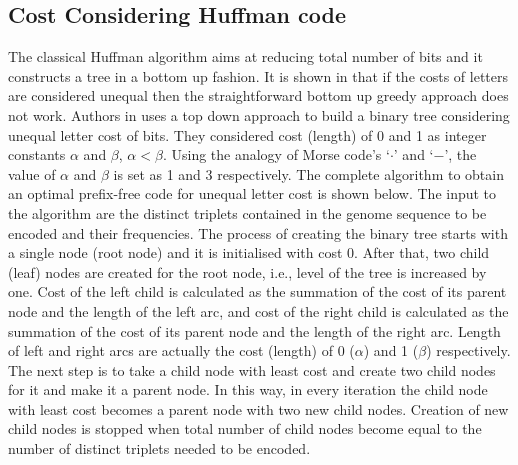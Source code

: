 \documentclass[preprint,12pt]{elsarticle}
\begin{document}
\subsection{Cost Considering Huffman code}
The classical Huffman algorithm aims at reducing total number of bits and it constructs a tree in a bottom up fashion. It is shown in \cite{golin98} that if the costs of letters are considered unequal then the straightforward bottom up greedy approach does not work. Authors in \cite{Kab14} uses a top down approach to build a binary tree considering unequal letter cost of bits. They considered cost (length) of 0 and 1 as integer constants $\alpha$ and $\beta$,   $\alpha < \beta$. Using the analogy of Morse code's `$\cdot$' and `$-$', the value of $\alpha$ and $\beta$ is set as 1 and 3 respectively. The complete algorithm to obtain an optimal prefix-free code for unequal letter cost is shown below. The input to the algorithm are the distinct triplets contained in the genome sequence to be encoded and their frequencies. The process of creating the binary tree starts with a single node (root node) and it is initialised with cost 0.  After that, two child (leaf) nodes are created for the root node, i.e., level of the tree is increased by one. Cost of the left child is calculated as the summation of the cost of its parent node and the length of the left arc, and cost of the right child is calculated as the summation of the cost of its parent node and the length of the right arc. Length of left and right arcs are actually the cost (length) of 0 ($\alpha$) and 1 ($\beta$) respectively. The next step is to take a child node with least cost and create two child nodes for it and make it a parent node. In this way, in every iteration the child node with least cost becomes a parent node with two new child nodes. Creation of new child nodes is stopped when total number of child nodes become equal to the number of distinct triplets needed to be encoded. 
\end{document}
